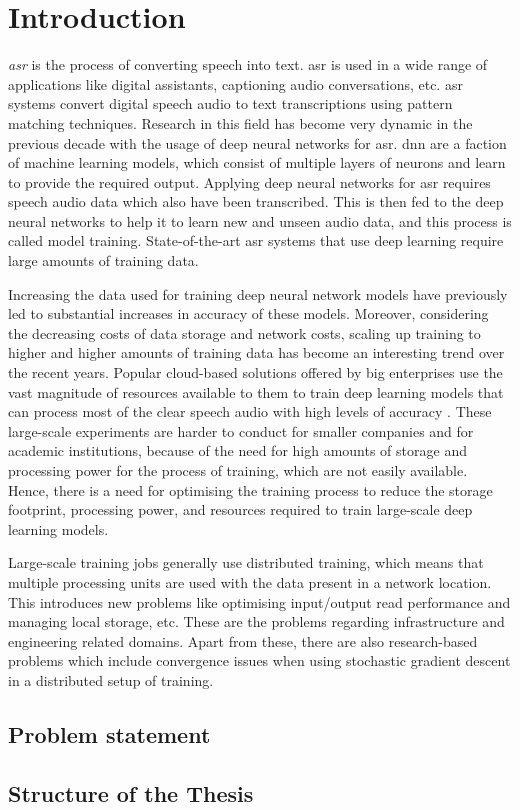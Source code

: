 \chapter{Introduction}
\label{chapter:intro}
\emph{\acrfull{asr}} is the process of converting speech into text. \acrshort{asr} is used in a wide range of applications like digital assistants,  captioning audio conversations, etc. \acrshort{asr} systems convert digital speech audio to text transcriptions using pattern matching techniques. Research in this field has become very dynamic in the previous decade with the usage of deep neural networks for \acrshort{asr}. \acrfull{dnn} are a faction of machine learning models, which consist of multiple layers of neurons and learn to provide the required output. Applying deep neural networks for \acrshort{asr} requires speech audio data which also have been transcribed. This is then fed to the deep neural networks to help it to learn new and unseen audio data, and this process is called model training. State-of-the-art \acrshort{asr} systems that use deep learning require large amounts of training data. 

Increasing the data used for training deep neural network models have previously led to substantial increases in accuracy of these models. Moreover, considering the decreasing costs of data storage and network costs, scaling up training to higher and higher amounts of training data has become an interesting trend over the recent years. Popular cloud-based solutions offered by big enterprises use the vast magnitude of resources available to them to train deep learning models that can process most of the clear speech audio with high levels of accuracy \cite{Li2020OnRecognition}. These large-scale experiments are harder to conduct for smaller companies and for academic institutions, because of the need for high amounts of storage and processing power for the process of training, which are not easily available. Hence, there is a need for optimising the training process to reduce the storage footprint, processing power, and resources required to train large-scale deep learning models.

Large-scale training jobs generally use distributed training, which means that multiple processing units are used with the data present in a network location. This introduces new problems like optimising input/output read performance and managing local storage, etc. These are the problems regarding infrastructure and engineering related domains. Apart from these, there are also research-based problems which include convergence issues when using stochastic gradient descent in a distributed setup of training.  



\section{Problem statement}




\section{Structure of the Thesis}
\label{section:structure} 


